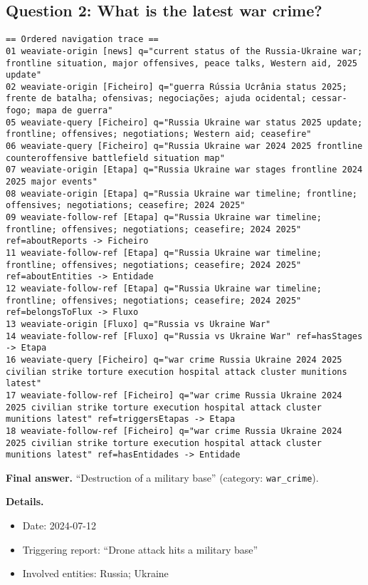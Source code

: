 \subsection*{Question 2: What is the latest war crime?}
\begin{lstlisting}
== Ordered navigation trace ==
01 weaviate-origin [news] q="current status of the Russia-Ukraine war; frontline situation, major offensives, peace talks, Western aid, 2025 update"
02 weaviate-origin [Ficheiro] q="guerra Rússia Ucrânia status 2025; frente de batalha; ofensivas; negociações; ajuda ocidental; cessar-fogo; mapa de guerra"
05 weaviate-query [Ficheiro] q="Russia Ukraine war status 2025 update; frontline; offensives; negotiations; Western aid; ceasefire"
06 weaviate-query [Ficheiro] q="Russia Ukraine war 2024 2025 frontline counteroffensive battlefield situation map"
07 weaviate-origin [Etapa] q="Russia Ukraine war stages frontline 2024 2025 major events"
08 weaviate-origin [Etapa] q="Russia Ukraine war timeline; frontline; offensives; negotiations; ceasefire; 2024 2025"
09 weaviate-follow-ref [Etapa] q="Russia Ukraine war timeline; frontline; offensives; negotiations; ceasefire; 2024 2025" ref=aboutReports -> Ficheiro
11 weaviate-follow-ref [Etapa] q="Russia Ukraine war timeline; frontline; offensives; negotiations; ceasefire; 2024 2025" ref=aboutEntities -> Entidade
12 weaviate-follow-ref [Etapa] q="Russia Ukraine war timeline; frontline; offensives; negotiations; ceasefire; 2024 2025" ref=belongsToFlux -> Fluxo
13 weaviate-origin [Fluxo] q="Russia vs Ukraine War"
14 weaviate-follow-ref [Fluxo] q="Russia vs Ukraine War" ref=hasStages -> Etapa
16 weaviate-query [Ficheiro] q="war crime Russia Ukraine 2024 2025 civilian strike torture execution hospital attack cluster munitions latest"
17 weaviate-follow-ref [Ficheiro] q="war crime Russia Ukraine 2024 2025 civilian strike torture execution hospital attack cluster munitions latest" ref=triggersEtapas -> Etapa
18 weaviate-follow-ref [Ficheiro] q="war crime Russia Ukraine 2024 2025 civilian strike torture execution hospital attack cluster munitions latest" ref=hasEntidades -> Entidade
\end{lstlisting}

\noindent\textbf{Final answer.} \enquote{Destruction of a military base} (category: \texttt{war\_crime}).

\noindent\textbf{Details.}
\begin{itemize}
	\item Date: 2024-07-12
	\item Triggering report: \enquote{Drone attack hits a military base}
	\item Involved entities: Russia; Ukraine
\end{itemize}

